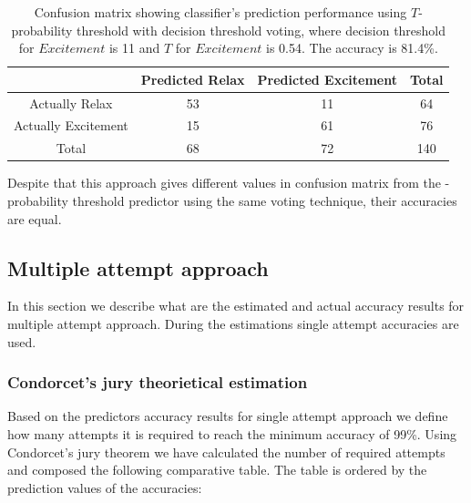\documentclass[12pt]{article}
\theoremstyle{definition}
\begin{document}
\begin{table}[H]
\begin{center}
  \begin{tabular}{ | c | c | c | c | }
    \hline
     & Predicted Relax & Predicted Excitement & Total \\ \hline
    Actually Relax & 53 & 11 & 64 \\ \hline
    Actually Excitement & 15 & 61 & 76 \\ \hline
    Total & 68 & 72 & 140 \\ 
    \hline
  \end{tabular}
\end{center}
\caption{Confusion matrix showing classifier's prediction performance using $T$-probability threshold with decision threshold voting, where decision threshold for $Excitement$ is 11 and $T$ for $Excitement$ is 0.54. The accuracy is 81.4\%.} 
\end{table}

Despite that this approach gives different values in confusion matrix from the -probability threshold predictor using the same voting technique, their accuracies are equal.

\subsection{Multiple attempt approach}

In this section we describe what are the estimated and actual accuracy results for multiple attempt approach. During the estimations single attempt accuracies are used.
\subsubsection{Condorcet's jury theorietical estimation}\label{condorcet1}
Based on the predictors accuracy results for single attempt approach we define how many attempts it is required to reach the minimum accuracy of 99\%. Using Condorcet's jury theorem we have calculated the number of required attempts and composed the following comparative table. The table is ordered by the prediction values of the accuracies:
\end{document}
